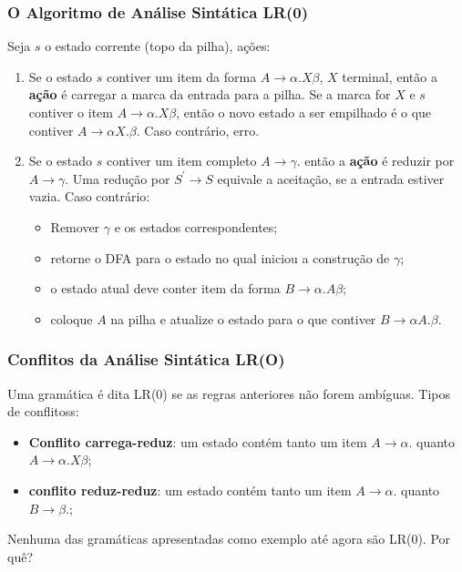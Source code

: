 \documentclass[table]{beamer}
\begin{document}
\begin{frame}
   \frametitle{O Algoritmo de Análise Sintática LR(0)}
   Seja $s$ o estado corrente (topo da pilha), ações:
   \begin{enumerate}
      \item Se o estado $s$ contiver um item da forma $A\to\alpha.X\beta$, $X$ terminal, então a \textbf{ação} é carregar a marca da entrada para a pilha. Se a marca for $X$ e $s$ contiver o item $A\to\alpha.X\beta$, então o novo estado a ser empilhado é o que contiver $A\to\alpha X.\beta$. Caso contrário, erro.
      \item Se o estado $s$ contiver um item completo $A\to\gamma.$ então a \textbf{ação} é reduzir por $A\to\gamma$. Uma redução por $S^{'}\to S$ equivale a aceitação, se a entrada estiver vazia. Caso contrário:
      \begin{itemize}
         \item Remover $\gamma$ e os estados correspondentes;
	 \item retorne o DFA para o estado no qual iniciou a construção de $\gamma$;
	 \item o estado atual deve conter item da forma $B\to\alpha.A\beta$;
	 \item coloque $A$ na pilha e atualize o estado para o que contiver $B\to\alpha A.\beta$.
      \end{itemize}
   \end{enumerate}
\end{frame}

\begin{frame}
   \frametitle{Conflitos da Análise Sintática LR(O)}
   Uma gramática é dita LR(0) se as regras anteriores não forem ambíguas. Tipos de conflitoss:
   \begin{itemize}
      \item \textbf{Conflito carrega-reduz}: um estado contém tanto um item $A\to\alpha.$ quanto $A\to\alpha.X\beta$;
      \item \textbf{conflito reduz-reduz}:  um estado contém tanto um item $A\to\alpha.$ quanto $B\to\beta.$;
  \end{itemize}
  Nenhuma das gramáticas apresentadas como exemplo até agora são LR(0). Por quê?
\end{frame}
\end{document}
